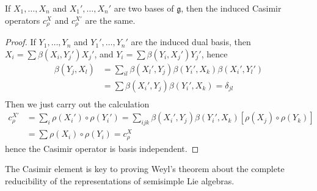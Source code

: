 \begin{theorem}
    If $X_1, \dots, X_n$ and $X_1', \dots, X_n'$ are two bases of $\mathfrak{g}$, then the induced Casimir operators $c_\rho^X$ and $c_\rho^{X'}$ are the same.
\end{theorem}
\begin{proof}
    If $Y_1, \dots, Y_n$ and $Y_1', \dots, Y_n'$ are the induced dual basis, then $X_i = \sum \beta(X_i, Y_j') X_j'$, and $Y_i = \sum \beta(Y_i,X_j') Y_j'$, hence
    \begin{align*}
        \beta(Y_j,X_l) &= \sum_{il} \beta(X_l', Y_j) \beta(Y_i', X_k) \beta(X_i', Y_l')\\
        &= \sum \beta(X_i', Y_j) \beta(Y_i', X_k) = \delta_{jl}\\
    \end{align*}
    Then we just carry out the calculation
    \begin{align*}
        c_\rho^{X'} &= \sum_i \rho(X_i') \circ \rho(Y_i') = \sum_{ijk} \beta(X_i', Y_j) \beta(Y_i',X_k) \left[ \rho(X_j) \circ \rho(Y_k) \right]\\
        &= \sum \rho(X_i) \circ \rho(Y_i) = c_\rho^X
    \end{align*}
    hence the Casimir operator is basis independent.
\end{proof}

The Casimir element is key to proving Weyl's theorem about the complete reducibility of the representations of semisimple Lie algebras.


